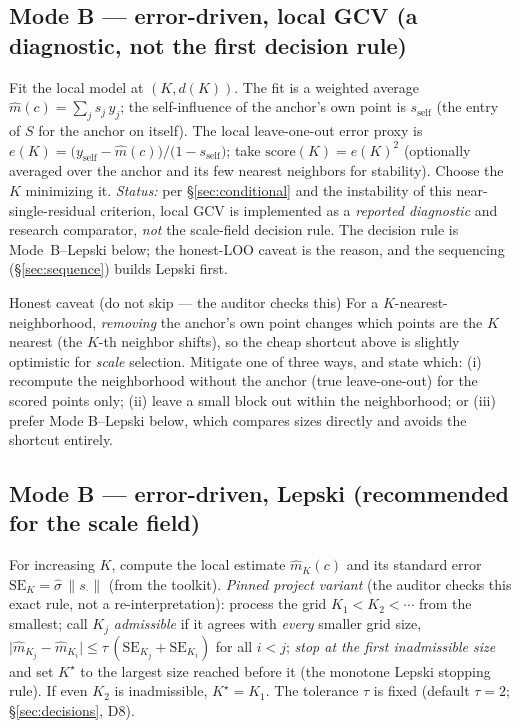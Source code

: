 \documentclass[11pt]{article}
\begin{document}
\subsection{Mode B --- error-driven, local GCV (a diagnostic, not the first decision rule)}
Fit the local model at $(K,d(K))$. The fit is a weighted average
$\hat m(c)=\sum_j s_j\,y_j$; the self-influence of the anchor's own point is
$s_{\text{self}}$ (the entry of $S$ for the anchor on itself). The local
leave-one-out error proxy is $e(K)=\big(y_{\text{self}}-\hat m(c)\big)/\big(1-s_{\text{self}}\big)$;
take $\text{score}(K)=e(K)^2$ (optionally averaged over the anchor and its few nearest
neighbors for stability). Choose the $K$ minimizing it.
\emph{Status:} per \S\ref{sec:conditional} and the instability of this
near-single-residual criterion, local GCV is implemented as a \emph{reported diagnostic}
and research comparator, \emph{not} the scale-field decision rule. The decision rule is
Mode~B--Lepski below; the honest-LOO caveat is the reason, and the sequencing
(\S\ref{sec:sequence}) builds Lepski first.

\begin{gate}{Honest caveat (do not skip --- the auditor checks this)}
For a $K$-nearest-neighborhood, \emph{removing} the anchor's own point changes which
points are the $K$ nearest (the $K$-th neighbor shifts), so the cheap shortcut above
is slightly optimistic for \emph{scale} selection. Mitigate one of three ways, and
state which: (i) recompute the neighborhood without the anchor (true leave-one-out)
for the scored points only; (ii) leave a small block out within the neighborhood; or
(iii) prefer Mode B--Lepski below, which compares sizes directly and avoids the
shortcut entirely.
\end{gate}

\subsection{Mode B --- error-driven, Lepski (recommended for the scale field)}
For increasing $K$, compute the local estimate $\hat m_K(c)$ and its standard error
$\mathrm{SE}_K=\hat\sigma\,\lVert s_{\cdot}\rVert$ (from the toolkit).
\emph{Pinned project variant} (the auditor checks this exact rule, not a re-interpretation):
process the grid $K_1<K_2<\cdots$ from the smallest; call $K_j$ \emph{admissible} if it
agrees with \emph{every} smaller grid size,
$\big|\hat m_{K_j}-\hat m_{K_i}\big|\le \tau\,(\mathrm{SE}_{K_j}+\mathrm{SE}_{K_i})$ for all
$i<j$; \emph{stop at the first inadmissible size} and set $K^\star$ to the largest size
reached before it (the monotone Lepski stopping rule). If even $K_2$ is inadmissible,
$K^\star=K_1$. The tolerance $\tau$ is fixed (default $\tau=2$; \S\ref{sec:decisions}, D8).
\end{document}
